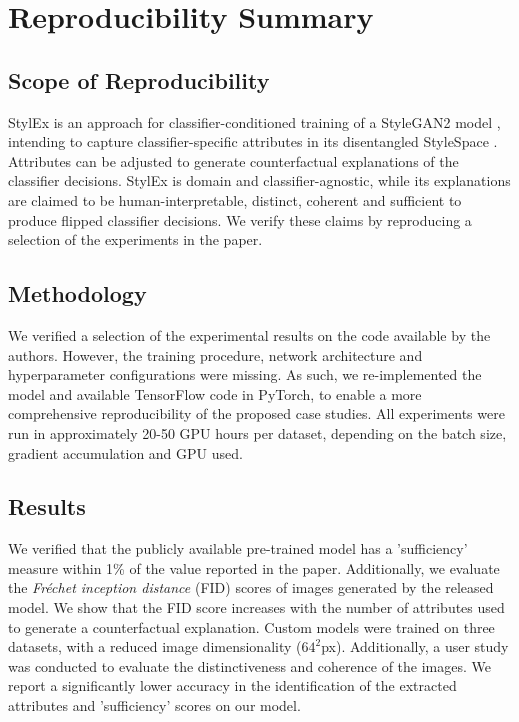 \section*{\centering Reproducibility Summary}

\subsection*{Scope of Reproducibility}

StylEx is an approach for classifier-conditioned training of a StyleGAN2 model \cite{karras2020analyzing}, intending to capture classifier-specific attributes in its disentangled StyleSpace \cite{9577297}. Attributes can be adjusted to generate counterfactual explanations of the classifier decisions. StylEx is domain and classifier-agnostic, while its explanations are claimed to be human-interpretable, distinct, coherent and sufficient to produce flipped classifier decisions. We verify these claims by reproducing a selection of the experiments in the paper.


\subsection*{Methodology}

We verified a selection of the experimental results on the code available by the authors. However, the training procedure, network architecture and hyperparameter configurations were missing. As such, we re-implemented the model and available TensorFlow code in PyTorch, to enable a more comprehensive reproducibility of the proposed case studies. All experiments were run in approximately 20-50 GPU hours per dataset, depending on the batch size, gradient accumulation and GPU used.


\subsection*{Results}

We verified that the publicly available pre-trained model has a 'sufficiency' measure within 1\% of the value reported in the paper. Additionally, we evaluate the \textit{Fréchet inception distance} (FID) scores of images generated by the released model. We show that the FID score increases with the number of attributes used to generate a counterfactual explanation. Custom models were trained on three datasets, with a reduced image dimensionality ($64^2$px). Additionally, a user study was conducted to evaluate the distinctiveness and coherence of the images. We report a significantly lower accuracy in the identification of the extracted attributes and 'sufficiency' scores on our model.


